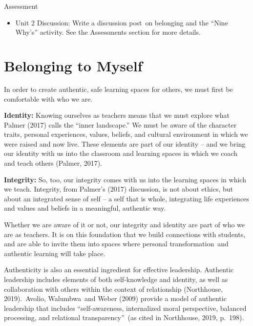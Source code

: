 \documentclass[
]{book}
\providecommand{\tightlist}{%
  \setlength{\itemsep}{0pt}\setlength{\parskip}{0pt}}
\begin{document}
\begin{assessment}
{Assessment}

\begin{itemize}
\tightlist
\item
  Unit 2 Discussion: Write a discussion post~on belonging and the ``Nine Why's'' activity. See the Assessments section for more details.
\end{itemize}
\end{assessment}

\hypertarget{belonging-to-myself}{%
\section{Belonging to Myself}\label{belonging-to-myself}}

In order to create authentic, safe learning spaces for others, we must first be comfortable with who we are.

\textbf{Identity:} Knowing ourselves as teachers means that we must explore what Palmer (2017) calls the ``inner landscape.'' We must be aware of the character traits, personal experiences, values, beliefs, and cultural environment in which we were raised and now live. These elements are part of our identity -- and we bring our identity with us into the classroom and learning spaces in which we coach and teach others (Palmer, 2017).

\textbf{Integrity:} So, too, our integrity comes with us into the learning spaces in which we teach. Integrity, from Palmer's (2017) discussion, is not about ethics, but about an integrated sense of self -- a self that is whole, integrating life experiences and values and beliefs in a meaningful, authentic way.

Whether we are aware of it or not, our integrity and identity are part of who we are as teachers. It is on this foundation that we build connections with students, and are able to invite them into spaces where personal transformation~and authentic learning will take place.

Authenticity is also an essential ingredient for effective leadership. Authentic leadership includes elements of both self-knowledge and identity, as well as collaboration with others within the context of relationship (Northhouse, 2019).~Avolio, Walumbwa~and Weber (2009) provide a model of authentic leadership that includes ``self-awareness, internalized moral perspective, balanced processing, and relational transparency''~(as cited in Northhouse, 2019, p.~198).
\end{document}
